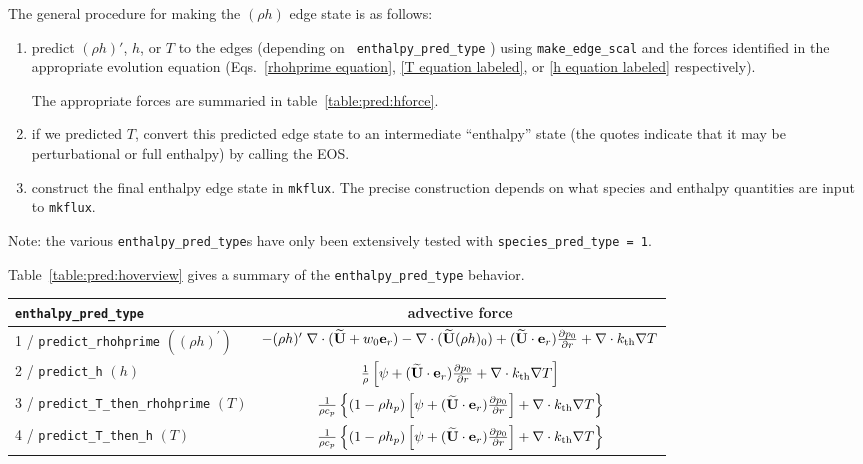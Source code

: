 The general procedure for making the $(\rho h)$ edge state is as follows:
\begin{enumerate}
\item predict $(\rho h)'$, $h$, or $T$ to the edges (depending on {\tt
  enthalpy\_pred\_type} ) using {\tt make\_edge\_scal} and the forces
  identified in the appropriate evolution equation
  (Eqs.~\ref{rhohprime equation}, \ref{T equation labeled}, or \ref{h
    equation labeled} respectively).

  The appropriate forces are summaried in table~\ref{table:pred:hforce}.

\item if we predicted $T$, convert this predicted
  edge state to an intermediate ``enthalpy'' state (the quotes
  indicate that it may be perturbational or full enthalpy) by calling
  the EOS.
 
\item construct the final enthalpy edge state in {\tt mkflux}.  The
  precise construction depends on what species and enthalpy quantities
  are input to {\tt mkflux}.

\end{enumerate}

\noindent Note: the various {\tt enthalpy\_pred\_type}s have only been
extensively tested with {\tt species\_pred\_type = 1}.

Table~\ref{table:pred:hoverview}
gives a summary
of the {\tt enthalpy\_pred\_type} behavior.


\begin{table*}[h]
\centering
\caption{Forcing term into {\tt make\_edge\_scal} \newline}
\label{table:pred:hforce}
\renewcommand{\arraystretch}{1.5}
\begin{tabular}{l|c}
\hline
\hline
{\tt enthalpy\_pred\_type} &   {advective force} \\
\hline
1 / {\tt predict\_rhohprime} $((\rho h)^\prime)$ &  
 $-(\rho h)^\prime \; \nabla \cdot (\widetilde{{\bf U}}+w_0 \mathbf{e}_r) - 
 \nabla \cdot (\widetilde{{\bf U}} (\rho h)_0) + (\widetilde{{\bf U}} \cdot \mathbf{e}_r) \frac{\partial p_0}{\partial r} + \nabla \cdot k_{\rm th} \nabla T$ \\
2 / {\tt predict\_h}  $(h)$ & $\frac{1}{\rho} \left [\psi + (\widetilde{{\bf U}} \cdot \mathbf{e}_r)
  \frac{\partial p_0}{\partial r} + \nabla \cdot k_{\rm th} \nabla T \right ]$ \\
3 / {\tt predict\_T\_then\_rhohprime} $(T)$ & $\frac{1}{\rho c_p} \left \{ (1 - \rho h_p) 
   \left [\psi + (\widetilde{{\bf U}} \cdot \mathbf{e}_r) \frac{\partial p_0}{\partial r} \right ] + \nabla \cdot k_{\rm th} \nabla T \right \}$ \\
4 / {\tt predict\_T\_then\_h}  $(T)$ & $\frac{1}{\rho c_p} \left\{ (1 - \rho h_p) \left [\psi + (\widetilde{{\bf U}} \cdot \mathbf{e}_r)
\frac{\partial p_0}{\partial r}\right ] +  \nabla \cdot k_{\rm th} \nabla T \right\}$ \\
\hline
\end{tabular}
\end{table*}



